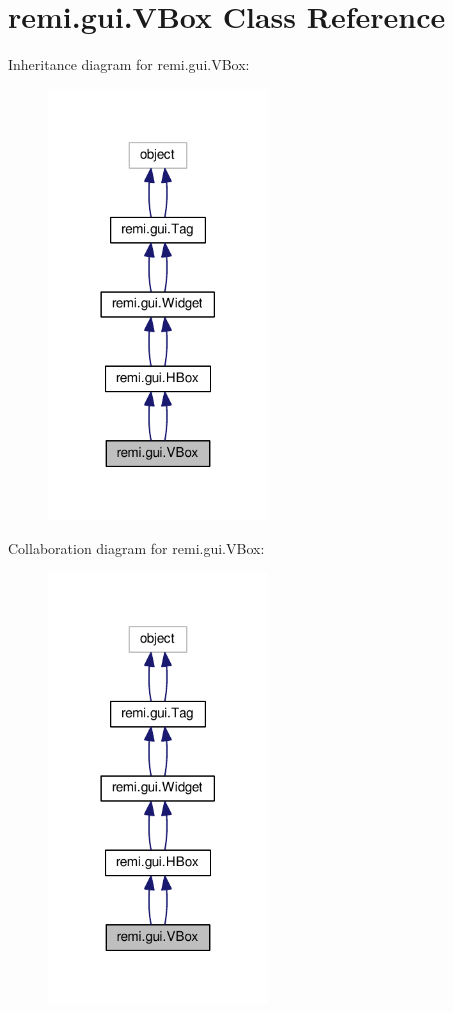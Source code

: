 \hypertarget{classremi_1_1gui_1_1VBox}{}\section{remi.\+gui.\+V\+Box Class Reference}
\label{classremi_1_1gui_1_1VBox}


Inheritance diagram for remi.\+gui.\+V\+Box\+:
\nopagebreak
\begin{figure}[H]
\begin{center}
\leavevmode
\includegraphics[width=165pt]{d4/d47/classremi_1_1gui_1_1VBox__inherit__graph}
\end{center}
\end{figure}


Collaboration diagram for remi.\+gui.\+V\+Box\+:
\nopagebreak
\begin{figure}[H]
\begin{center}
\leavevmode
\includegraphics[width=165pt]{d8/d2a/classremi_1_1gui_1_1VBox__coll__graph}
\end{center}
\end{figure}
